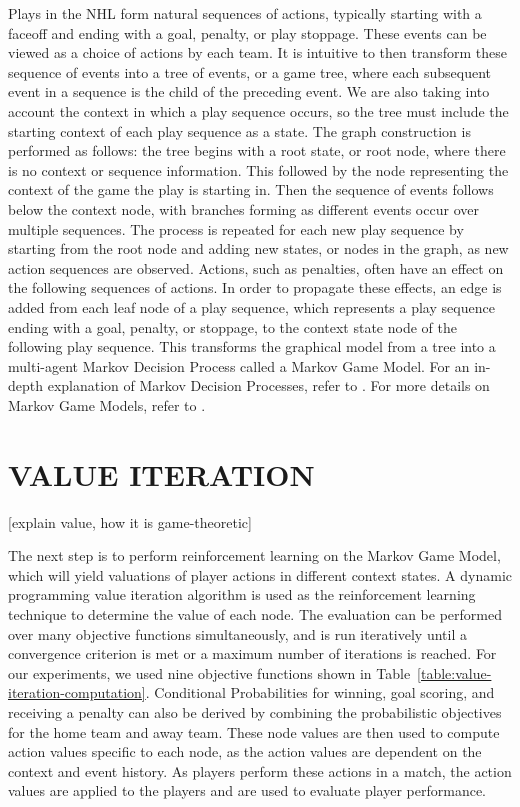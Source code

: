 \documentclass[]{article}
\begin{document}
Plays in the NHL form natural sequences of actions, typically starting with a faceoff and ending with a goal, penalty, or play stoppage. These events can be viewed as a choice of actions by each team. It is intuitive to then transform these sequence of events into a tree of events, or a game tree, where each subsequent event in a sequence is the child of the preceding event. We are also taking into account the context in which a play sequence occurs, so the tree must include the starting context of each play sequence as a state. The graph construction is performed as follows: the tree begins with a root state, or root node, where there is no context or sequence information. This followed by the node representing the context of the game the play is starting in. Then the sequence of events follows below the context node, with branches forming as different events occur over multiple sequences. The process is repeated for each new play sequence by starting from the root node and adding new states, or nodes in the graph, as new action sequences are observed. Actions, such as penalties, often have an effect on the following sequences of actions. In order to propagate these effects, an edge is added from each leaf node of a play sequence, which represents a play sequence ending with a goal, penalty, or stoppage, to the context state node of the following play sequence. This transforms the graphical model from a tree into a multi-agent Markov Decision Process called a Markov Game Model. For an in-depth explanation of Markov Decision Processes, refer to \citep{Russell2010}. For more details on Markov Game Models, refer to \citep{Littman1994}.

\section{VALUE ITERATION}
[explain value, how it is game-theoretic]

The next step is to perform reinforcement learning on the Markov Game Model, which will yield valuations of player actions in different context states. A dynamic programming value iteration algorithm is used as the reinforcement learning technique to determine the value of each node. The evaluation can be performed over many objective functions simultaneously, and is run iteratively until a convergence criterion is met or a maximum number of iterations is reached. For our experiments, we used nine objective functions shown in Table~\ref{table:value-iteration-computation}. Conditional Probabilities for winning, goal scoring, and receiving a penalty can also be derived by combining the probabilistic objectives for the home team and away team. These node values are then used to compute action values specific to each node, as the action values are dependent on the context and event history. As players perform these actions in a match, the action values are applied to the players and are used to evaluate player performance.
\end{document}
